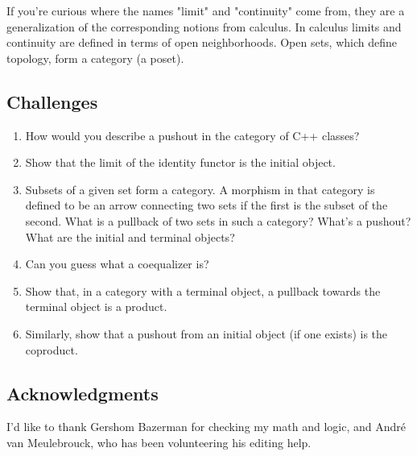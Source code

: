 If you're curious where the names "limit" and "continuity" come
from, they are a generalization of the corresponding notions from
calculus. In calculus limits and continuity are defined in terms of open
neighborhoods. Open sets, which define topology, form a category (a
poset).

\subsection{Challenges}\label{challenges}

\begin{enumerate}
\tightlist
\item
  How would you describe a pushout in the category of C++ classes?
\item
  Show that the limit of the identity functor
   is the initial object.
\item
  Subsets of a given set form a category. A morphism in that category is
  defined to be an arrow connecting two sets if the first is the subset
  of the second. What is a pullback of two sets in such a category?
  What's a pushout? What are the initial and terminal objects?
\item
  Can you guess what a coequalizer is?
\item
  Show that, in a category with a terminal object, a pullback towards
  the terminal object is a product.
\item
  Similarly, show that a pushout from an initial object (if one exists)
  is the coproduct.
\end{enumerate}

\subsection{Acknowledgments}\label{acknowledgments}

I'd like to thank Gershom Bazerman for checking my math and logic, and
André van Meulebrouck, who has been volunteering his editing help.
